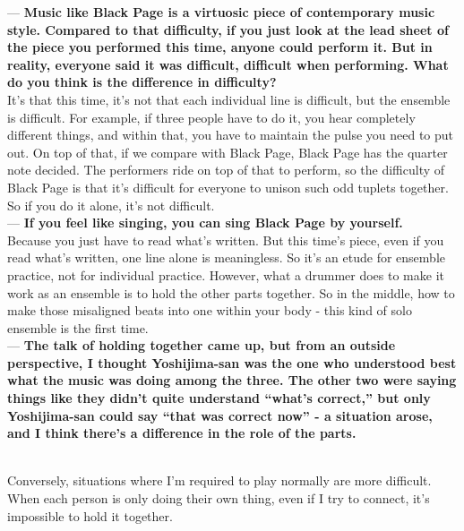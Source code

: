 \begin{description}
--- {\bf Music like Black Page is a virtuosic piece of contemporary music style. Compared to that difficulty, if you just look at the lead sheet of the piece you performed this time, anyone could perform it. But in reality, everyone said it was difficult, difficult when performing. What do you think is the difference in difficulty?}\\

It's that this time, it's not that each individual line is difficult, but the ensemble is difficult. For example, if three people have to do it, you hear completely different things, and within that, you have to maintain the pulse you need to put out. On top of that, if we compare with Black Page, Black Page has the quarter note decided. The performers ride on top of that to perform, so the difficulty of Black Page is that it's difficult for everyone to unison such odd tuplets together. So if you do it alone, it's not difficult.\\

--- {\bf If you feel like singing, you can sing Black Page by yourself.}\\

Because you just have to read what's written. But this time's piece, even if you read what's written, one line alone is meaningless. So it's an etude for ensemble practice, not for individual practice. However, what a drummer does to make it work as an ensemble is to hold the other parts together. So in the middle, how to make those misaligned beats into one within your body - this kind of solo ensemble is the first time.\\

--- {\bf The talk of holding together came up, but from an outside perspective, I thought Yoshijima-san was the one who understood best what the music was doing among the three. The other two were saying things like they didn't quite understand ``what's correct,'' but only Yoshijima-san could say ``that was correct now'' - a situation arose, and I think there's a difference in the role of the parts.}

\item [Is there any difference compared to what you usually do?]\mbox{}\\

Conversely, situations where I'm required to play normally are more difficult. When each person is only doing their own thing, even if I try to connect, it's impossible to hold it together.\\


\end{description}
